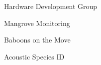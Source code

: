 \item Hardware Development Group
\item Mangrove Monitoring
\item Baboons on the Move
\item Acoustic Species ID

